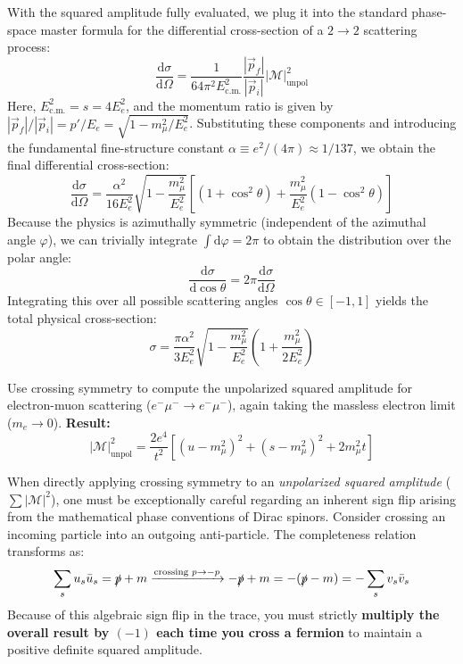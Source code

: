 With the squared amplitude fully evaluated, we plug it into the standard phase-space master formula for the differential cross-section of a $2 \to 2$ scattering process:
\[
    \frac{\mathrm{d} \sigma}{\mathrm{d} \Omega} = \frac{1}{64 \pi^2 E_{\text{c.m.}}^2} \frac{|\vec{p}_f|}{|\vec{p}_i|} \vert \mathcal{M} \vert_{\text{unpol}}^2
\]
Here, $E_{\text{c.m.}}^2 = s = 4E_e^2$, and the momentum ratio is given by $|\vec{p}_f|/|\vec{p}_i| = p'/E_e = \sqrt{1 - m_\mu^2/E_e^2}$. Substituting these components and introducing the fundamental fine-structure constant $\alpha \equiv e^2 / (4\pi) \approx 1/137$, we obtain the final differential cross-section:
\[
    \frac{\mathrm{d} \sigma}{\mathrm{d} \Omega} = \frac{\alpha^2}{16 E_e^2} \sqrt{1 - \frac{m_\mu^2}{E_e^2}} \left[ (1 + \cos^2\theta) + \frac{m_\mu^2}{E_e^2} (1 - \cos^2\theta) \right]
\]
Because the physics is azimuthally symmetric (independent of the azimuthal angle $\varphi$), we can trivially integrate $\int \mathrm{d}\varphi = 2\pi$ to obtain the distribution over the polar angle:
\[
    \frac{\mathrm{d} \sigma}{\mathrm{d} \cos\theta} = 2\pi \frac{\mathrm{d} \sigma}{\mathrm{d} \Omega}
\]
Integrating this over all possible scattering angles $\cos\theta \in [-1, 1]$ yields the total physical cross-section:
\[
    \sigma = \frac{\pi \alpha^2}{3 E_e^2} \sqrt{1 - \frac{m_\mu^2}{E_e^2}} \left( 1 + \frac{m_\mu^2}{2E_e^2} \right)
\]

\begin{example}[Exercise]
    Use crossing symmetry to compute the unpolarized squared amplitude for electron-muon scattering ($e^- \mu^- \to e^- \mu^-$), again taking the massless electron limit ($m_e \to 0$).
    \textbf{Result:}
    \[
        \vert \mathcal{M} \vert_{\text{unpol}}^2 = \frac{2 e^4}{t^2} \left[ (u - m_\mu^2)^2 + (s - m_\mu^2)^2 + 2m_\mu^2 t \right]
    \]
\end{example}

\begin{remark}
    When directly applying crossing symmetry to an \textit{unpolarized squared amplitude} ($\sum|\mathcal{M}|^2$), one must be exceptionally careful regarding an inherent sign flip arising from the mathematical phase conventions of Dirac spinors.
    Consider crossing an incoming particle into an outgoing anti-particle. The completeness relation transforms as:
    \[
        \sum_s u_s \bar{u}_s = \slashed{p} + m \xrightarrow{\text{crossing } p \to -p} -\slashed{p} + m = -(\slashed{p} - m) = - \sum_s v_s \bar{v}_s
    \]
    Because of this algebraic sign flip in the trace, you must strictly \textbf{multiply the overall result by $(-1)$ each time you cross a fermion} to maintain a positive definite squared amplitude.
\end{remark}

